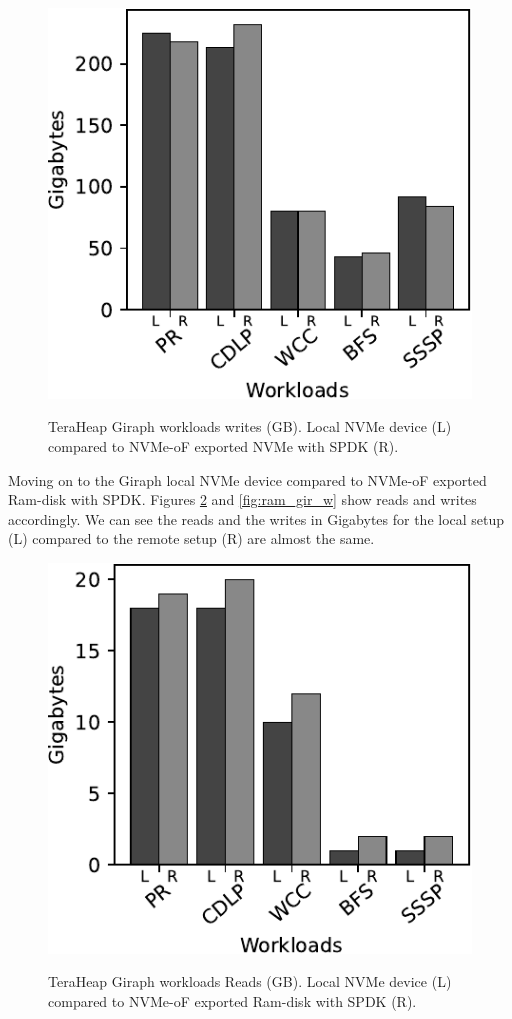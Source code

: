 \begin{figure}[H]
  \includegraphics[width=\linewidth]{figures/giraph_w.pdf}\\
\caption{TeraHeap Giraph workloads writes (GB). Local NVMe device (L) compared to NVMe-oF exported NVMe with SPDK (R).}
\label{fig:giraph_w}
\end{figure}
 Moving on to the Giraph local NVMe device compared to NVMe-oF exported Ram-disk with SPDK. Figures \ref{fig:ram_gir_r} and \ref{fig:ram_gir_w} show reads and
 writes accordingly. We can see the reads and the writes in Gigabytes for the local setup (L) compared to the remote setup (R) are almost the same.
\begin{figure}[H]
  \includegraphics[width=\linewidth]{figures/ram_gir_r.pdf}\\
\caption{TeraHeap Giraph workloads Reads (GB). Local NVMe device (L) compared to NVMe-oF exported Ram-disk with SPDK (R).}
\label{fig:ram_gir_r}
\end{figure}

